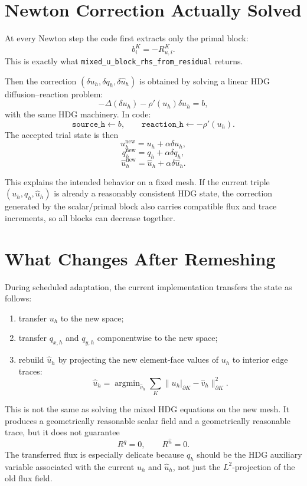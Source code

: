 \documentclass[11pt]{article}
\newcommand{\uhat}{\widehat u}
\begin{document}
\section{Newton Correction Actually Solved}

At every Newton step the code first extracts only the primal block:
\[
  b^K_i = -R^K_{u,i}.
\]
This is exactly what \texttt{mixed\_u\_block\_rhs\_from\_residual}
returns.

Then the correction \((\delta u_h,\delta q_h,\delta\uhat_h)\) is
obtained by solving a linear HDG diffusion--reaction problem:
\[
  -\Delta(\delta u_h) - \rho'(u_h)\delta u_h
  =
  b,
\]
with the same HDG machinery.  In code:
\[
  \texttt{source\_h} \leftarrow b,
  \qquad
  \texttt{reaction\_h} \leftarrow -\rho'(u_h).
\]
The accepted trial state is then
\[
  u_h^{\mathrm{new}}
  =
  u_h+\alpha\delta u_h,
\]
\[
  q_h^{\mathrm{new}}
  =
  q_h+\alpha\delta q_h,
\]
\[
  \uhat_h^{\mathrm{new}}
  =
  \uhat_h+\alpha\delta\uhat_h.
\]

This explains the intended behavior on a fixed mesh.  If the current
triple \((u_h,q_h,\uhat_h)\) is already a reasonably consistent HDG
state, the correction generated by the scalar/primal block also carries
compatible flux and trace increments, so all blocks can decrease
together.

\section{What Changes After Remeshing}

During scheduled adaptation, the current implementation transfers the
state as follows:
\begin{enumerate}[label=(\arabic*)]
  \item transfer \(u_h\) to the new space;
  \item transfer \(q_{x,h}\) and \(q_{y,h}\) componentwise to the new
  space;
  \item rebuild \(\uhat_h\) by projecting the new element-face values of
  \(u_h\) to interior edge traces:
  \[
    \uhat_h
    =
    \operatorname{argmin}_{\widehat v_h}
    \sum_{K}\|u_h|_{\partial K}-\widehat v_h\|^2_{\partial K}.
  \]
\end{enumerate}
This is not the same as solving the mixed HDG equations on the new mesh.
It produces a geometrically reasonable scalar field and a geometrically
reasonable trace, but it does not guarantee
\[
  R^q = 0,
  \qquad
  R^{\widehat u}=0.
\]
The transferred flux is especially delicate because \(q_h\) should be
the HDG auxiliary variable associated with the current \(u_h\) and
\(\uhat_h\), not just the \(L^2\)-projection of the old flux field.
\end{document}

